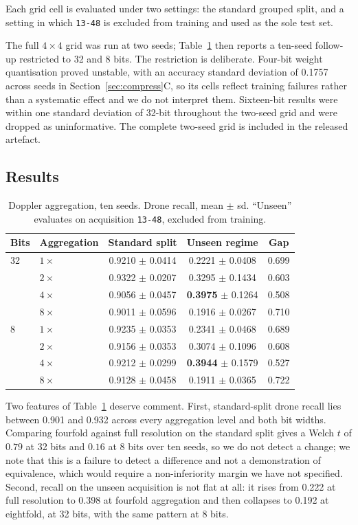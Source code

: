 \documentclass[conference]{IEEEtran}
\begin{document}
Each grid cell is evaluated under two settings: the standard grouped split,
and a setting in which \texttt{13-48} is excluded from training and used as
the sole test set.

The full $4\times4$ grid was run at two seeds; Table~\ref{tab:agg} then
reports a ten-seed follow-up restricted to 32 and 8 bits. The restriction is
deliberate. Four-bit weight quantisation proved unstable, with an accuracy
standard deviation of 0.1757 across seeds in Section~\ref{sec:compress}C, so
its cells reflect training failures rather than a systematic effect and we do
not interpret them. Sixteen-bit results were within one standard deviation of
32-bit throughout the two-seed grid and were dropped as uninformative. The
complete two-seed grid is included in the released artefact.

\subsection{Results}

\begin{table}[t]
\caption{Doppler aggregation, ten seeds. Drone recall, mean $\pm$ sd.
``Unseen'' evaluates on acquisition \texttt{13-48}, excluded from training.}
\label{tab:agg}
\centering
\begin{tabular}{llccc}
\toprule
Bits & Aggregation & Standard split & Unseen regime & Gap \\
\midrule
32 & $1\times$ & 0.9210 $\pm$ 0.0414 & 0.2221 $\pm$ 0.0408 & 0.699 \\
   & $2\times$ & 0.9322 $\pm$ 0.0207 & 0.3295 $\pm$ 0.1434 & 0.603 \\
   & $4\times$ & 0.9056 $\pm$ 0.0457 & \textbf{0.3975} $\pm$ 0.1264 & 0.508 \\
   & $8\times$ & 0.9011 $\pm$ 0.0596 & 0.1916 $\pm$ 0.0267 & 0.710 \\
\midrule
8  & $1\times$ & 0.9235 $\pm$ 0.0353 & 0.2341 $\pm$ 0.0468 & 0.689 \\
   & $2\times$ & 0.9156 $\pm$ 0.0353 & 0.3074 $\pm$ 0.1096 & 0.608 \\
   & $4\times$ & 0.9212 $\pm$ 0.0299 & \textbf{0.3944} $\pm$ 0.1579 & 0.527 \\
   & $8\times$ & 0.9128 $\pm$ 0.0458 & 0.1911 $\pm$ 0.0365 & 0.722 \\
\bottomrule
\end{tabular}
\end{table}

Two features of Table~\ref{tab:agg} deserve comment. First, standard-split
drone recall lies between 0.901 and 0.932 across every aggregation level and
both bit widths. Comparing fourfold against full resolution on the standard
split gives a Welch $t$ of $0.79$ at 32 bits and $0.16$ at 8 bits over ten
seeds, so we do not detect a change; we note that this is a failure to detect
a difference and not a demonstration of equivalence, which would require a
non-inferiority margin we have not specified. Second, recall on the unseen acquisition is not flat at all: it
rises from 0.222 at full resolution to 0.398 at fourfold aggregation and
then collapses to 0.192 at eightfold, at 32 bits, with the same pattern at 8
bits.
\end{document}

